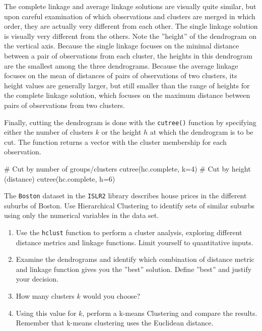 The complete linkage and average linkage solutions are visually quite similar, but upon careful examination of which observations and clusters are merged in which order, they are actually very different from each other. The single linkage solution is visually very different from the others. Note the ''height'' of the dendrogram on the vertical axis. Because the single linkage focuses on the minimal distance between a pair of observations from each cluster, the heights in this dendrogram are the smallest among the three dendrograms. Because the average linkage focuses on the mean of distances of pairs of observations of two clusters, its height values are generally larger, but still smaller than the range of heights for the complete linkage solution, which focuses on the maximum distance between pairs of observations from two clusters. 

Finally, cutting the dendrogram is done with the \texttt{cutree()} function by specifying either the number of clusters $k$ or the height $h$ at which the dendrogram is to be cut. The function returns a vector with the cluster membership for each observation.

\begin{Rcode}
# Cut by number of groups/clusters
cutree(hc.complete, k=4)
# Cut by height (distance)
cutree(hc.complete, h=6)
\end{Rcode}

\begin{exercisebox}

The \texttt{Boston} dataset in the \texttt{ISLR2} library describes house prices in the different suburbs of Boston. Use Hierarchical Clustering to identify sets of similar suburbs using only the numerical variables in the data set.
\begin{enumerate}
   \item Use the \texttt{hclust} function to perform a cluster analysis, exploring different distance metrics and linkage functions. Limit yourself to quantitative inputs.
   \item Examine the dendrograms and identify which combination of distance metric and linkage function gives you the ''best'' solution. Define ''best'' and justify your decision.
   \item How many clusters $k$ would you choose?
   \item Using this value for $k$, perform a k-means Clustering and compare the results. Remember that k-means clustering uses the Euclidean distance.
\end{enumerate}
\end{exercisebox}

